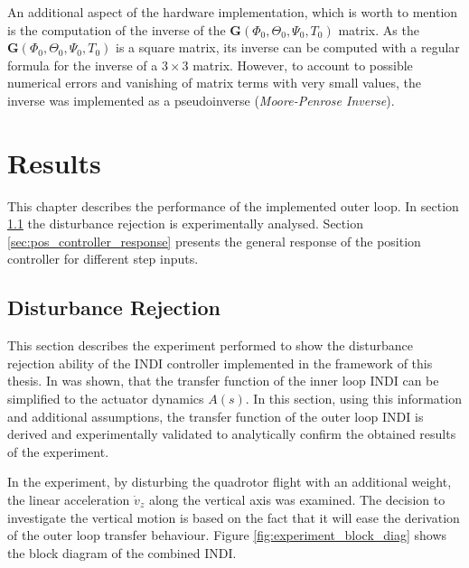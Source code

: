 \documentclass[11pt, a4paper, twoside]{report}
\begin{document}
An additional aspect of the hardware implementation, which is worth to mention is the computation of the inverse of the $\bm{G}(\Phi_0, \Theta_0, \Psi_0, T_0)$ matrix. As the $\bm{G}(\Phi_0, \Theta_0, \Psi_0, T_0)$ is a square matrix, its inverse can be computed with a regular formula for the inverse of a $3 \times 3$ matrix. However, to account to possible numerical errors and vanishing of matrix terms with very small values, the inverse was implemented as a pseudoinverse (\textit{Moore-Penrose Inverse}).

\chapter{Results} \label{cha:results}

This chapter describes the performance of the implemented outer loop. In section \ref{sec:disturbance_rejection} the disturbance rejection is experimentally analysed. Section \ref{sec:pos_controller_response} presents the general response of the position controller for different step inputs.

\thispagestyle{fancy}

\section{Disturbance Rejection} \label{sec:disturbance_rejection}

This section describes the experiment performed to show the disturbance rejection ability of the \acrshort{INDI} controller implemented in the framework of this thesis. In \cite{Smeur1} was shown, that the transfer function of the inner loop \acrshort{INDI} can be simplified to the actuator dynamics $A(s)$. In this section, using this information and additional assumptions, the transfer function of the outer loop \acrshort{INDI} is derived and experimentally validated to analytically confirm the obtained results of the experiment. 

In the experiment, by disturbing the quadrotor flight with an additional weight, the linear acceleration  $\dot{v}_{z}$ along the vertical axis was examined. The decision to investigate the vertical motion is based on the fact that it will ease the derivation of the outer loop transfer behaviour. Figure \ref{fig:experiment_block_diag} shows the block diagram of the combined \acrshort{INDI}.
\end{document}

